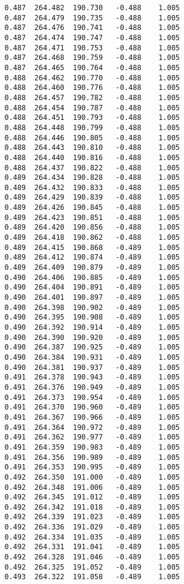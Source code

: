 \begin{verbatim}
   0.487  264.482  190.730   -0.488    1.005
   0.487  264.479  190.735   -0.488    1.005
   0.487  264.476  190.741   -0.488    1.005
   0.487  264.474  190.747   -0.488    1.005
   0.487  264.471  190.753   -0.488    1.005
   0.487  264.468  190.759   -0.488    1.005
   0.487  264.465  190.764   -0.488    1.005
   0.488  264.462  190.770   -0.488    1.005
   0.488  264.460  190.776   -0.488    1.005
   0.488  264.457  190.782   -0.488    1.005
   0.488  264.454  190.787   -0.488    1.005
   0.488  264.451  190.793   -0.488    1.005
   0.488  264.448  190.799   -0.488    1.005
   0.488  264.446  190.805   -0.488    1.005
   0.488  264.443  190.810   -0.488    1.005
   0.488  264.440  190.816   -0.488    1.005
   0.488  264.437  190.822   -0.488    1.005
   0.489  264.434  190.828   -0.488    1.005
   0.489  264.432  190.833   -0.488    1.005
   0.489  264.429  190.839   -0.488    1.005
   0.489  264.426  190.845   -0.488    1.005
   0.489  264.423  190.851   -0.488    1.005
   0.489  264.420  190.856   -0.488    1.005
   0.489  264.418  190.862   -0.488    1.005
   0.489  264.415  190.868   -0.489    1.005
   0.489  264.412  190.874   -0.489    1.005
   0.489  264.409  190.879   -0.489    1.005
   0.490  264.406  190.885   -0.489    1.005
   0.490  264.404  190.891   -0.489    1.005
   0.490  264.401  190.897   -0.489    1.005
   0.490  264.398  190.902   -0.489    1.005
   0.490  264.395  190.908   -0.489    1.005
   0.490  264.392  190.914   -0.489    1.005
   0.490  264.390  190.920   -0.489    1.005
   0.490  264.387  190.925   -0.489    1.005
   0.490  264.384  190.931   -0.489    1.005
   0.490  264.381  190.937   -0.489    1.005
   0.491  264.378  190.943   -0.489    1.005
   0.491  264.376  190.949   -0.489    1.005
   0.491  264.373  190.954   -0.489    1.005
   0.491  264.370  190.960   -0.489    1.005
   0.491  264.367  190.966   -0.489    1.005
   0.491  264.364  190.972   -0.489    1.005
   0.491  264.362  190.977   -0.489    1.005
   0.491  264.359  190.983   -0.489    1.005
   0.491  264.356  190.989   -0.489    1.005
   0.491  264.353  190.995   -0.489    1.005
   0.492  264.350  191.000   -0.489    1.005
   0.492  264.348  191.006   -0.489    1.005
   0.492  264.345  191.012   -0.489    1.005
   0.492  264.342  191.018   -0.489    1.005
   0.492  264.339  191.023   -0.489    1.005
   0.492  264.336  191.029   -0.489    1.005
   0.492  264.334  191.035   -0.489    1.005
   0.492  264.331  191.041   -0.489    1.005
   0.492  264.328  191.046   -0.489    1.005
   0.492  264.325  191.052   -0.489    1.005
   0.493  264.322  191.058   -0.489    1.005

\end{verbatim}
